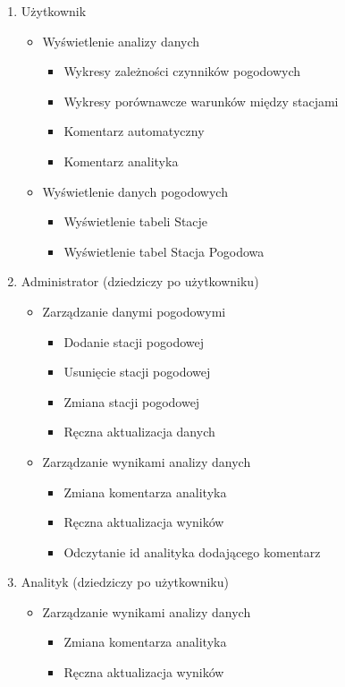 \documentclass[12pt,a4paper]{article}
\begin{document}
 \newpage
\begin{small}
\begin{enumerate}
\item Użytkownik
    \begin{itemize}
    \item Wyświetlenie analizy danych
        \begin{itemize}
        \item Wykresy zależności czynników pogodowych
        \item Wykresy porównawcze warunków między stacjami
        \item Komentarz automatyczny
        \item Komentarz analityka
        \end{itemize}
    \item Wyświetlenie danych pogodowych
        \begin{itemize}
        \item Wyświetlenie tabeli Stacje
        \item Wyświetlenie tabel Stacja Pogodowa
        \end{itemize}
    \end{itemize}
\item Administrator (dziedziczy po użytkowniku)
    \begin{itemize}
    \item Zarządzanie danymi pogodowymi
        \begin{itemize}
        \item Dodanie stacji pogodowej
        \item Usunięcie stacji pogodowej
        \item Zmiana stacji pogodowej
        \item Ręczna aktualizacja danych
        \end{itemize}
    \item Zarządzanie wynikami analizy danych
        \begin{itemize}
        \item Zmiana komentarza analityka
        \item Ręczna aktualizacja wyników
        \item Odczytanie id analityka dodającego komentarz
        \end{itemize}
    \end{itemize}
\item Analityk (dziedziczy po użytkowniku)
    \begin{itemize}
    \item Zarządzanie wynikami analizy danych
        \begin{itemize}
        \item Zmiana komentarza analityka
        \item Ręczna aktualizacja wyników
        \end{itemize}
    \end{itemize}
\end{enumerate}
 
\end{small}
\end{document}
